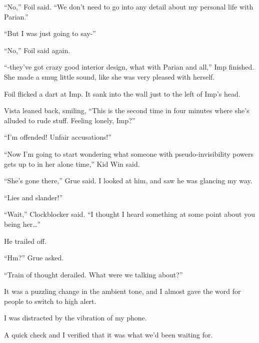 ``No,'' Foil said.  ``We don't need to go into any detail about my personal life with Parian.''



``But I was just going to say-''



``No,'' Foil said again.



``-they've got crazy good interior design, what with Parian and all,'' Imp finished.  She made a smug little sound, like she was very pleased with herself.



Foil flicked a dart at Imp.  It sank into the wall just to the left of Imp's head.



Vista leaned back, smiling, ``This is the second time in four minutes where she's alluded to rude stuff.  Feeling lonely, Imp?''



``I'm offended!  Unfair accusations!''



``Now I'm going to start wondering what someone with pseudo-invisibility powers gets up to in her alone time,'' Kid Win said.



``She's gone there,'' Grue said.  I looked at him, and saw he was glancing my way.



``Lies and slander!''



``Wait,'' Clockblocker said.  ``I thought I heard something at some point about you being her\ldots''



He trailed off.



``Hm?'' Grue asked.



``Train of thought derailed.  What were we talking about?''



It was a puzzling change in the ambient tone, and I almost gave the word for people to switch to high alert.



I was distracted by the vibration of my phone.



A quick check and I verified that it was what we'd been waiting for.



